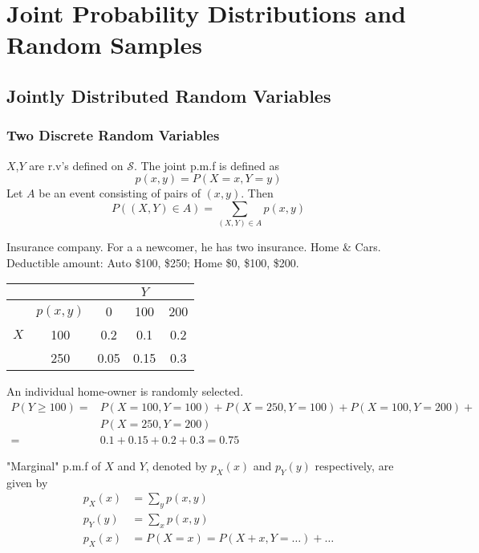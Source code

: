 \chapter{Joint Probability Distributions and Random Samples}
\section{Jointly Distributed Random Variables}
\subsection{Two Discrete Random Variables}
$X$,$Y$ are r.v's defined on $\mathcal{S}$. The joint p.m.f is defined as 
\[p(x,y)=P(X=x,Y=y)\]
Let $A$ be an event consisting of pairs of $(x,y)$. Then
\[P\left((X,Y)\in A\right) = \sum_{(X,Y)\in A}p(x,y)\]

\begin{exmp}
Insurance company. For a a newcomer, he has two insurance. Home \& Cars. Deductible amount: Auto \$100, \$250; Home \$0, \$100, \$200.
\begin{center}
\begin{tabular}{c|c|ccc}
\hline
    &     &    & $Y$ &   \\
\hline
    & $p(x,y)$ & 0    & 100  & 200  \\
$X$ & 100      & 0.2  & 0.1  & 0.2  \\
    & 250      & 0.05 & 0.15 & 0.3  \\
\hline
\end{tabular}
\end{center}
An individual home-owner is randomly selected.
\begin{align*}
P(Y \geq 100)=& P(X=100, Y=100)+P(X=250, Y=100)+P(X=100, Y=200)+\\
&P(X=250, Y=200)\\
=& 0.1+0.15+0.2+0.3=0.75
\end{align*}
\end{exmp}

\begin{defn}
"Marginal" p.m.f of $X$ and $Y$, denoted by $p_X(x)$ and $p_Y(y)$ respectively, are given by
\begin{align*}
p_X(x)&=\sum_{y}p(x,y)	\\
p_Y(y)&=\sum_{x}p(x,y)	\\
p_X(x)&=P(X=x)=P(X+x,Y=\dots)+\dots
\end{align*}
\end{defn}

